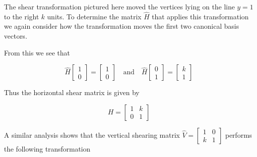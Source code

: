 \documentclass[12pt]{article}
\newcommand{\nin}{\noindent}
\newcommand{\vthree}{\vspace{3mm}}
\newcommand{\mymat}[1]{
\left[
\begin{array}{rrrrrrrrrrrrrrrrrrrrrrrrrrrrrrrrrrrrrrr}
#1
\end{array}
\right]
}
\newcommand{\be}{\mathbf{e}}
\begin{document}
\vthree

\nin The shear transformation pictured here moved the vertices lying on the line $y=1$ to the right $k$ units.  To determine the matrix $\hat{H}$ that applies this transformation we again consider how the transformation moves the first two canonical basis vectors.

\vspace{10mm}

\begin{center}
\end{center}

\vthree

\nin From this we see that

\[
\hat{H}\mymat{1 \\ 0} = \mymat{1 \\ 0}
\quad \textrm{and} \quad
\hat{H}\mymat{0 \\ 1} = \mymat{k \\ 1}
\]

\clearpage

\nin Thus the horizontal shear matrix is given by

\[
\hat{H} =
\mymat{
1 & k \\
0 & 1
}
\]

\vthree

\nin A similar analysis shows that the vertical shearing matrix $\hat{V} = \mymat{1 & 0 \\ k & 1}$ performs the following transformation
\end{document}
